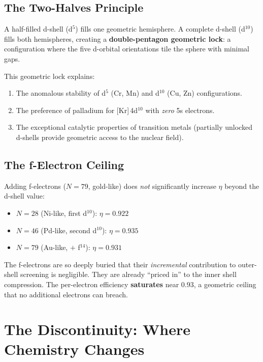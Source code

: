 \subsection{The Two-Halves Principle}

A half-filled d-shell (d$^5$) fills one geometric hemisphere.  A complete d-shell (d$^{10}$) fills both hemispheres, creating a \textbf{double-pentagon geometric lock}: a configuration where the five d-orbital orientations tile the sphere with minimal gaps.

This geometric lock explains:
\begin{enumerate}
  \item The anomalous stability of d$^5$ (Cr, Mn) and d$^{10}$ (Cu, Zn) configurations.
  \item The preference of palladium for [Kr]\,4d$^{10}$ with \emph{zero} 5s electrons.
  \item The exceptional catalytic properties of transition metals (partially unlocked d-shells provide geometric access to the nuclear field).
\end{enumerate}

\subsection{The f-Electron Ceiling}

Adding f-electrons ($N = 79$, gold-like) does \emph{not} significantly increase $\eta$ beyond the d-shell value:
\begin{itemize}
  \item $N = 28$ (Ni-like, first d$^{10}$): $\eta = 0.922$
  \item $N = 46$ (Pd-like, second d$^{10}$): $\eta = 0.935$
  \item $N = 79$ (Au-like, $+$ f$^{14}$): $\eta = 0.931$
\end{itemize}

The f-electrons are so deeply buried that their \emph{incremental} contribution to outer-shell screening is negligible.  They are already ``priced in'' to the inner shell compression.  The per-electron efficiency \textbf{saturates} near $0.93$, a geometric ceiling that no additional electrons can breach.


\section{The Discontinuity: Where Chemistry Changes}
\label{sec:discontinuity}

